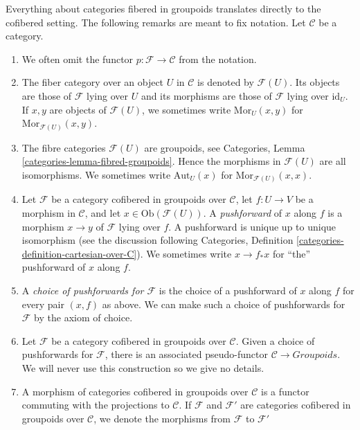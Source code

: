\begin{remarks}
\label{remarks-cofibered-groupoids}
Everything about categories fibered in groupoids translates directly to the 
cofibered setting. The following remarks are meant to fix notation.
Let $\mathcal{C}$ be a category.
\begin{enumerate}
\item We often omit the functor $p: \mathcal{F} \to \mathcal{C}$ from the 
notation.
\item The fiber category over an object $U$ in $\mathcal{C}$ is denoted by 
$\mathcal{F}(U)$. Its objects are those of $\mathcal{F}$ lying over $U$ and its 
morphisms are those of $\mathcal{F}$ lying over $\text{id}_{U}$.
If $x,y$  are objects of $\mathcal{F}(U)$, we sometimes write
$\text{Mor}_U(x, y)$ for $\text{Mor}_{\mathcal{F}(U)}(x, y)$.
\item The fibre categories $\mathcal{F}(U)$ are groupoids, see
Categories, Lemma \ref{categories-lemma-fibred-groupoids}.
Hence the morphisms in $\mathcal{F}(U)$ are all isomorphisms.
We sometimes write $\text{Aut}_U(x)$ for $\text{Mor}_{\mathcal{F}(U)}(x, x)$.
\item
\label{item-pushforward}
Let $\mathcal{F}$ be a category cofibered in groupoids over
$\mathcal{C}$, let $f: U \to V$ be a morphism in $\mathcal{C}$, and
let $x \in \text{Ob}(\mathcal{F}(U))$.
A {\it pushforward} of $x$ along $f$ is a morphism 
$x \to y$ of $\mathcal{F}$ lying over $f$. A pushforward
is unique up to unique isomorphism (see the discussion following
Categories, Definition \ref{categories-definition-cartesian-over-C}).
We sometimes write $x \to f_*x$ for ``the'' pushforward of $x$
along $f$.
\item A {\it choice of pushforwards for $\mathcal{F}$} is the choice of
a pushforward of $x$ along $f$ for every pair $(x,f)$ as above. We can make
such a choice of pushforwards for $\mathcal{F}$ by the axiom of choice.
\item Let $\mathcal{F}$ be a category cofibered in groupoids over
$\mathcal{C}$. Given a choice of pushforwards for $\mathcal{F}$, there
is an associated pseudo-functor $\mathcal{C} \to \textit{Groupoids}$.
We will never use this construction so we give no details.
\item
\label{item-cofibered-morphism}
A morphism of categories cofibered in groupoids over $\mathcal{C}$ is a
functor commuting with the projections to $\mathcal{C}$. If $\mathcal{F}$
and $\mathcal{F}'$ are categories cofibered in groupoids over
$\mathcal{C}$, we denote the morphisms from $\mathcal{F}$ to $\mathcal{F}'$

\end{enumerate}
\end{remarks}
